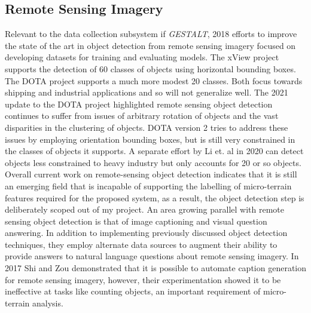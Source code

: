 \subsection{Remote Sensing Imagery}
Relevant to the data collection subsystem if \textit{GESTALT}, 2018 efforts to improve the state of the art in object detection from remote sensing imagery focused on developing datasets for training and evaluating models. 
The xView project supports the detection of 60 classes of objects\cite{Lam2018} using horizontal bounding boxes. The DOTA project supports a much more modest 20 classes\cite{Xia2018}. 
Both focus towards shipping and industrial applications and so will not generalize well. The 2021 update to the DOTA project highlighted remote sensing object detection continues to suffer from issues of arbitrary rotation of objects and the vast disparities in the clustering of objects\cite{Ding2021}. 
DOTA version 2 tries to address these issues by employing orientation bounding boxes, but is still very constrained in the classes of objects it supports. 
A separate effort by Li et. al in 2020 can detect objects less constrained to heavy industry but only accounts for 20 or so objects\cite{Li2020}. 
Overall current work on remote-sensing object detection indicates that it is still an emerging field that is incapable of supporting the labelling of micro-terrain features required for the proposed system, as a result, the object detection step is deliberately scoped out of my project.
An area growing parallel with remote sensing object detection is that of image captioning and visual question answering. 
In addition to implementing previously discussed object detection techniques, they employ alternate data sources to augment their ability to provide answers to natural language questions about remote sensing imagery. 
In 2017 Shi and Zou demonstrated that it is possible to automate caption generation for remote sensing imagery, however, their experimentation showed it to be ineffective at tasks like counting objects\cite{Shi2017}, an important requirement of micro-terrain analysis.

